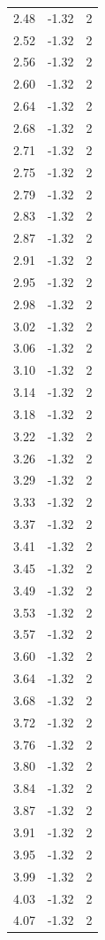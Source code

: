 \begin{longtable}{lrr}
  2.48 & -1.32 & 2 \\
  2.52 & -1.32 & 2 \\
  2.56 & -1.32 & 2 \\
  2.60 & -1.32 & 2 \\
  2.64 & -1.32 & 2 \\
  2.68 & -1.32 & 2 \\
  2.71 & -1.32 & 2 \\
  2.75 & -1.32 & 2 \\
  2.79 & -1.32 & 2 \\
  2.83 & -1.32 & 2 \\
  2.87 & -1.32 & 2 \\
  2.91 & -1.32 & 2 \\
  2.95 & -1.32 & 2 \\
  2.98 & -1.32 & 2 \\
  3.02 & -1.32 & 2 \\
  3.06 & -1.32 & 2 \\
  3.10 & -1.32 & 2 \\
  3.14 & -1.32 & 2 \\
  3.18 & -1.32 & 2 \\
  3.22 & -1.32 & 2 \\
  3.26 & -1.32 & 2 \\
  3.29 & -1.32 & 2 \\
  3.33 & -1.32 & 2 \\
  3.37 & -1.32 & 2 \\
  3.41 & -1.32 & 2 \\
  3.45 & -1.32 & 2 \\
  3.49 & -1.32 & 2 \\
  3.53 & -1.32 & 2 \\
  3.57 & -1.32 & 2 \\
  3.60 & -1.32 & 2 \\
  3.64 & -1.32 & 2 \\
  3.68 & -1.32 & 2 \\
  3.72 & -1.32 & 2 \\
  3.76 & -1.32 & 2 \\
  3.80 & -1.32 & 2 \\
  3.84 & -1.32 & 2 \\
  3.87 & -1.32 & 2 \\
  3.91 & -1.32 & 2 \\
  3.95 & -1.32 & 2 \\
  3.99 & -1.32 & 2 \\
  4.03 & -1.32 & 2 \\
  4.07 & -1.32 & 2 \\

\end{longtable}
